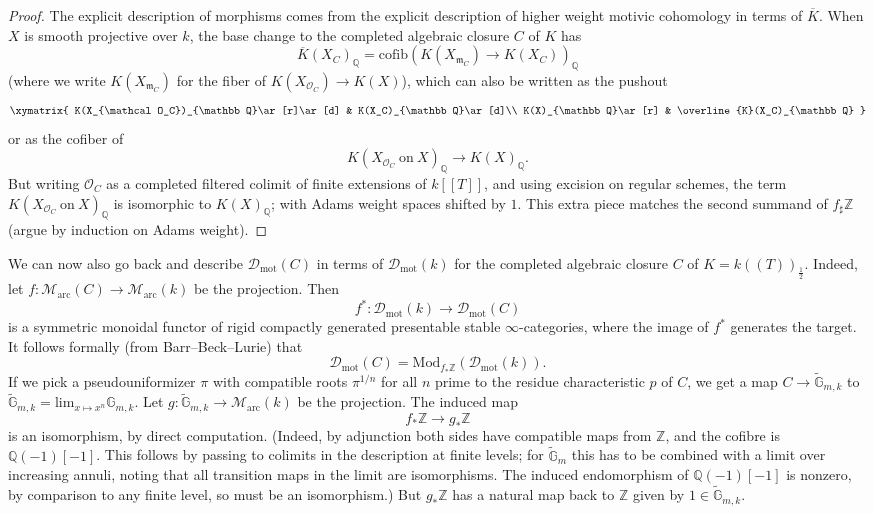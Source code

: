\documentclass[11pt]{amsart}
\numberwithin{equation}{section}
\numberwithin{theorem}{section}
\theoremstyle{definition}
\begin{document}
\begin{proof}
The explicit description of morphisms comes from the explicit description of higher weight motivic cohomology in terms of $\overline{K}$. When $X$ is smooth projective over $k$, the base change to the completed algebraic closure $C$ of $K$ has
\[
\overline{K}(X_C)_{\mathbb Q} = \mathrm{cofib}(K(X_{\mathfrak m_C})\to K(X_C))_{\mathbb Q}
\]
(where we write $K(X_{\mathfrak m_C})$ for the fiber of $K(X_{\mathcal O_C})\to K(X)$), which can also be written as the pushout
\[\xymatrix{
K(X_{\mathcal O_C})_{\mathbb Q}\ar[r]\ar[d] & K(X_C)_{\mathbb Q}\ar[d]\\
K(X)_{\mathbb Q}\ar[r] & \overline{K}(X_C)_{\mathbb Q}
}\]
or as the cofiber of
\[
K(X_{\mathcal O_C}\ \mathrm{on}\ X)_{\mathbb Q}\to K(X)_{\mathbb Q}.
\]
But writing $\mathcal O_C$ as a completed filtered colimit of finite extensions of $k[[T]]$, and using excision on regular schemes, the term $K(X_{\mathcal O_C}\ \mathrm{on}\ X)_{\mathbb Q}$ is isomorphic to $K(X)_{\mathbb Q}$; with Adams weight spaces shifted by $1$. This extra piece matches the second summand of $f_\sharp \mathbb Z$ (argue by induction on Adams weight).
\end{proof}

We can now also go back and describe $\mathcal D_{\mathrm{mot}}(C)$ in terms of $\mathcal D_{\mathrm{mot}}(k)$ for the completed algebraic closure $C$ of $K=k((T))_{\tfrac 12}$. Indeed, let $f: \mathcal M_{\mathrm{arc}}(C)\to \mathcal M_{\mathrm{arc}}(k)$ be the projection. Then
\[
f^\ast: \mathcal D_{\mathrm{mot}}(k)\to \mathcal D_{\mathrm{mot}}(C)
\]
is a symmetric monoidal functor of rigid compactly generated presentable stable $\infty$-categories, where the image of $f^\ast$ generates the target. It follows formally (from Barr--Beck--Lurie) that
\[
\mathcal D_{\mathrm{mot}}(C) = \mathrm{Mod}_{f_\ast \mathbb Z}(\mathcal D_{\mathrm{mot}}(k)).
\]
If we pick a pseudouniformizer $\pi$ with compatible roots $\pi^{1/n}$ for all $n$ prime to the residue characteristic $p$ of $C$, we get a map $C\to \tilde{\mathbb G}_{m,k}$ to $\tilde{\mathbb G}_{m,k} = \mathrm{lim}_{x\mapsto x^n} \mathbb G_{m,k}$. Let $g: \tilde{\mathbb G}_{m,k}\to \mathcal M_{\mathrm{arc}}(k)$ be the projection. The induced map
\[
f_\ast \mathbb Z\to g_\ast \mathbb Z
\]
is an isomorphism, by direct computation. (Indeed, by adjunction both sides have compatible maps from $\mathbb Z$, and the cofibre is $\mathbb Q(-1)[-1]$. This follows by passing to colimits in the description at finite levels; for $\tilde{\mathbb G}_m$ this has to be combined with a limit over increasing annuli, noting that all transition maps in the limit are isomorphisms. The induced endomorphism of $\mathbb Q(-1)[-1]$ is nonzero, by comparison to any finite level, so must be an isomorphism.) But $g_\ast \mathbb Z$ has a natural map back to $\mathbb Z$ given by $1\in \tilde{\mathbb G}_{m,k}$.
\end{document}
